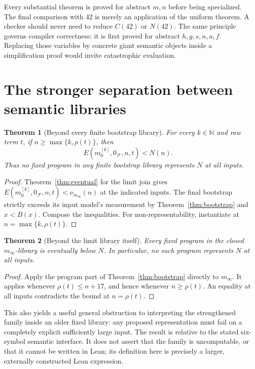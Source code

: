 \documentclass[11pt,letterpaper]{article}
\newtheorem{theorem}{Theorem}[section]
\theoremstyle{definition}
\newcommand{\N}{\mathbb N}
\newcommand{\Fam}{\mathcal F}
\begin{document}
Every substantial theorem is proved for abstract $m,n$ before being
specialized. The final comparison with 42 is merely an application of the
uniform theorem. A checker should never need to reduce $C(42)$ or $N(42)$.
The same principle governs compiler correctness: it is first proved for
abstract $h,g,s,n,a,f$. Replacing those variables by concrete giant semantic
objects inside a simplification proof would invite catastrophic evaluation.

\section{The stronger separation between semantic libraries}
\label{sec:stronger}

\begin{theorem}[Beyond every finite bootstrap library]
\label{thm:allrounds}
For every $k\in\N$ and raw term $t$, if
$n\ge\max\{k,\rho(t)\}$, then
\[
 E(m_0^{[k]},0_{\Fam},n,t)<N(n).
\]
Thus no fixed program in any finite bootstrap library represents $N$ at all
inputs.
\end{theorem}
\begin{proof}
Theorem~\ref{thm:eventual} for the limit join gives
$E(m_0^{[k]},0_{\Fam},n,t)<\nu_{m_\infty}(n)$ at the indicated inputs.
The final bootstrap strictly exceeds its input model's measurement by
Theorem~\ref{thm:bootstrap} and $x<B(x)$. Compose the inequalities.
For non-representability, instantiate at $n=\max\{k,\rho(t)\}$.
\end{proof}

\begin{theorem}[Beyond the limit library itself]
\label{thm:limitnonrep}
Every fixed program in the closed $m_\infty$-library is eventually below $N$.
In particular, no such program represents $N$ at all inputs.
\end{theorem}
\begin{proof}
Apply the program part of Theorem~\ref{thm:bootstrap} directly to $m_\infty$.
It applies whenever $\rho(t)\le n+17$, and hence whenever $n\ge\rho(t)$.
An equality at all inputs contradicts the bound at $n=\rho(t)$.
\end{proof}

This also yields a useful general obstruction to interpreting the strengthened
family inside an older fixed library: any proposed representation must fail
on a completely explicit sufficiently large input. The result is relative to
the stated six-symbol semantic interface. It does not assert that the family
is uncomputable, or that it cannot be written in Lean; its definition here is
precisely a larger, externally constructed Lean expression.
\end{document}
